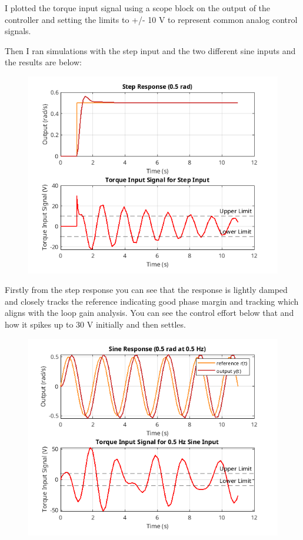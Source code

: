 \documentclass{article}
\begin{document}
I plotted the torque input signal using a scope block on the output of the controller and setting the limits to +/- 10 V to represent common analog control signals.

Then I ran simulations with the step input and the two different sine inputs and the results are below:

\begin{figure}[H]
    \centering
    \includegraphics[width=\textwidth]{stepResponse.png}
    \label{fig:stepResponse}
\end{figure}

Firstly from the step response you can see that the response is lightly damped and closely tracks the reference indicating good phase margin and tracking which aligns with the loop gain analysis.
You can see the control effort below that and how it spikes up to 30 V initially and then settles.

\begin{figure}[H]
    \centering
    \includegraphics[width=\textwidth]{halfSineResponse.png}
    \label{fig:halfSineResponse}
\end{figure}
\end{document}
